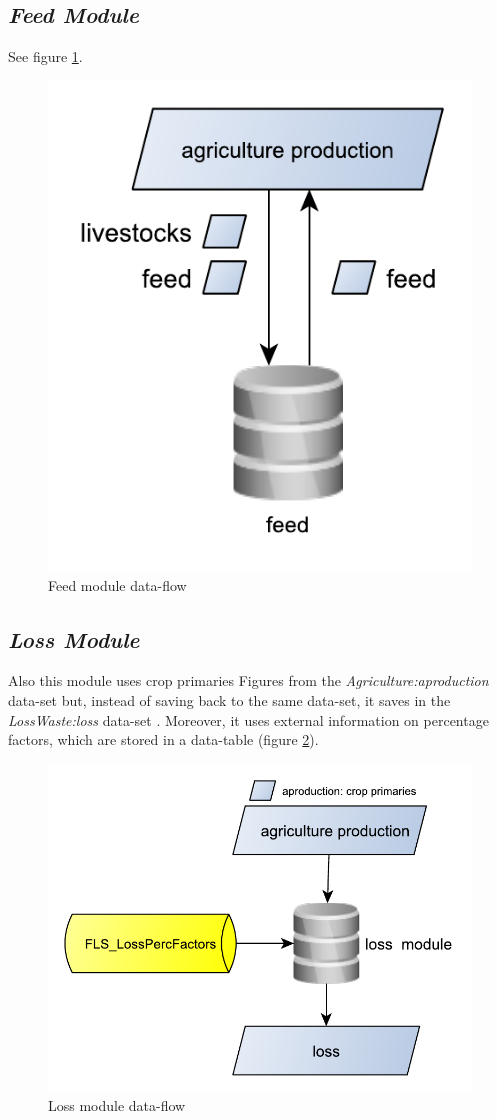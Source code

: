 \documentclass[]{article}
\begin{document}
\subsection{\texorpdfstring{\emph{Feed
Module}}{Feed Module}}\label{feed-module}

See figure \ref{fig:f11}.

\begin{figure}[H]

{\centering \includegraphics[width=0.3\linewidth]{images/SwsFbs/11_feed} 

}

\caption{\label{fig:f11}Feed module data-flow}\label{fig:f11}
\end{figure}

\subsection{\texorpdfstring{\emph{Loss
Module}}{Loss Module}}\label{loss-module}

Also this module uses crop primaries Figures from the
\emph{Agriculture:aproduction} data-set but, instead of saving back to
the same data-set, it saves in the \emph{LossWaste:loss} data-set .
Moreover, it uses external information on percentage factors, which are
stored in a data-table (figure \ref{fig:f12}).

\begin{figure}[H]

{\centering \includegraphics[width=0.45\linewidth]{images/SwsFbs/12_loss} 

}

\caption{\label{fig:f12}Loss module data-flow}\label{fig:f12}
\end{figure}
\end{document}
